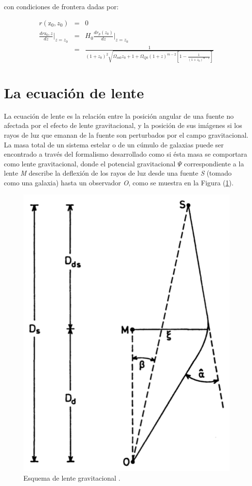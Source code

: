 con condiciones de frontera dadas por:

\begin{eqnarray}
r(\textrm{z}_0, z_0) &=& 0 \\
\frac{dr \textrm{z}_0, z}{d z} |_{z = z_0} &=& H_0 \frac{dr_p(z_0)}{d z} |_{z = z_0} \\
    & = & \frac{1}{(1+z_0)^2 \sqrt{\Omega_{m0}z_0 + 1 + \Omega_{Q0}(1+z)^{m-2} \left [ 1-\frac{1}{(1+z_0)^{m-2} } \right ]  }}
\end{eqnarray}


\section{La ecuación de lente}

La ecuación de lente es la relación entre la posición angular de una fuente no afectada por el efecto de lente gravitacional, y la posición de sus imágenes si los rayos de luz que emanan de la fuente son perturbados por el campo gravitacional.\\

La masa total de un sistema estelar o de un cúmulo de galaxias puede ser encontrado a través del formalismo desarrollado como si ésta masa se comportara como lente gravitacional, donde el potencial gravitacional $\Psi$ correspondiente a la lente \emph{M} describe la deflexión  de los rayos de luz desde una fuente \emph{S} (tomado como una galaxia) hasta un observador \emph{O}, como se muestra en la Figura (\ref{fig:grav_lens_1}).\\

\begin{figure}
\centering%
\includegraphics[width=0.4\columnwidth]{Kap3/grav_lens_1.png}%
\caption{Esquema de lente gravitacional \cite{SN92}.}
\label{fig:grav_lens_1}
\end{figure}

